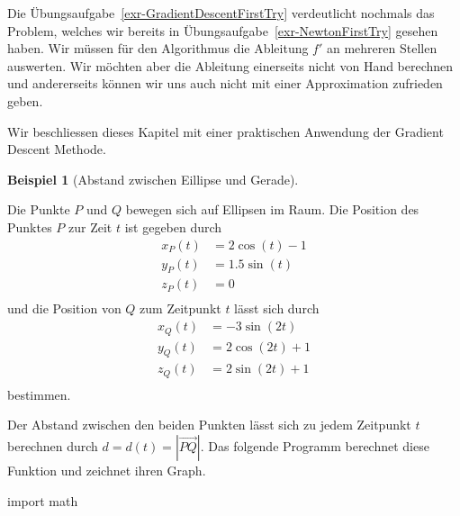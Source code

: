 \documentclass[
  letterpaper,
  DIV=11,
  oneside]{scrreprt}
\newenvironment{Shaded}{\begin{snugshade}}{\end{snugshade}}
\newcommand{\ImportTok}[1]{\textcolor[rgb]{0.00,0.46,0.62}{#1}}
\newcommand{\NormalTok}[1]{\textcolor[rgb]{0.00,0.23,0.31}{#1}}
\theoremstyle{definition}
\theoremstyle{definition}
\newtheorem{example}{Beispiel}[chapter]
\theoremstyle{remark}
\begin{document}
Die Übungsaufgabe~\ref{exr-GradientDescentFirstTry} verdeutlicht
nochmals das Problem, welches wir bereits in
Übungsaufgabe~\ref{exr-NewtonFirstTry} gesehen haben. Wir müssen für den
Algorithmus die Ableitung \(f'\) an mehreren Stellen auswerten. Wir
möchten aber die Ableitung einerseits nicht von Hand berechnen und
andererseits können wir uns auch nicht mit einer Approximation zufrieden
geben.

Wir beschliessen dieses Kapitel mit einer praktischen Anwendung der
Gradient Descent Methode.

\leavevmode{}%
\begin{example}[Abstand zwischen Eillipse und
Gerade]\label{exm-GDApplication}

Die Punkte \(P\) und \(Q\) bewegen sich auf Ellipsen im Raum. Die
Position des Punktes \(P\) zur Zeit \(t\) ist gegeben durch \[
\begin{flalign}
    x_P(t) &= 2 \cos(t) - 1 \\
    y_P(t) &= 1.5 \sin(t)   \\
    z_P(t) &= 0             \\
\end{flalign}
\] und die Position von \(Q\) zum Zeitpunkt \(t\) lässt sich durch \[
\begin{flalign}
    x_Q(t) &= -3 \sin(2t)     \\
    y_Q(t) &= 2 \cos(2t) + 1  \\
    z_Q(t) &= 2 \sin(2t) + 1  \\
\end{flalign}
\] bestimmen.

Der Abstand zwischen den beiden Punkten lässt sich zu jedem Zeitpunkt
\(t\) berechnen durch \(d = d(t) = |\overrightarrow{PQ}|\). Das folgende
Programm berechnet diese Funktion und zeichnet ihren Graph.

\begin{Shaded}
\begin{Highlighting}[]
\ImportTok{import}\NormalTok{ math}


\end{Highlighting}
\end{Shaded}
\end{example}
\end{document}
